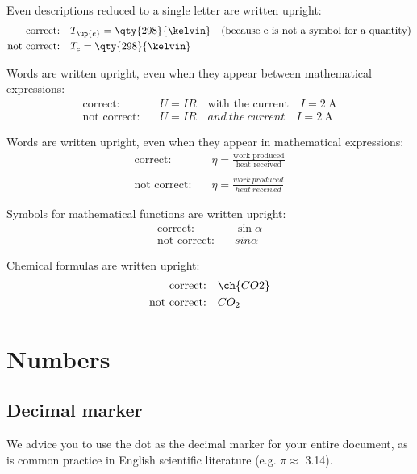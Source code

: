 Even descriptions reduced to a single letter are written upright:
\begin{align*}
    \text{correct:} \quad & T_\up{e} = \qty{298}{\kelvin}\quad \text{(because e is not a symbol for a quantity)} \\
    \text{not correct:} \quad & T_{e} = \qty{298}{\kelvin}
\end{align*}

Words are written upright, even when they appear between mathematical expressions:
\begin{align*}
    \text{correct:}     \quad &  U=I R \quad \text{with the current} \quad I=\qty{2}{\ampere}\\
    \text{not correct:} \quad &  U=I R \quad and\ the\ current \quad I=\qty{2}{\ampere}
\end{align*}

Words are written upright, even when they appear in mathematical expressions:
\begin{align*}
    \text{correct:}     \quad &   \eta=\frac{\text{work produced}}{\text{heat received}}\\
    \\
    \text{not correct:} \quad &   \eta=\frac{work\ produced}{heat\ received}
\end{align*}

Symbols for mathematical functions are written upright:
\begin{align*}
    \text{correct:}     \quad &   \sin\alpha\\
    \text{not correct:} \quad &   sin\alpha
\end{align*}

Chemical formulas are written upright:
\begin{align*}
    \text{correct:}     \quad &   \ch{CO2}\\
    \text{not correct:} \quad &       CO_2
\end{align*}

\section{Numbers}\label{sec:formatnumbers}
\subsection{Decimal marker}
We advice you to use the dot as the decimal marker for your entire document, as is common practice in English scientific literature (e.g. $\pi\approx$ 3.14).

